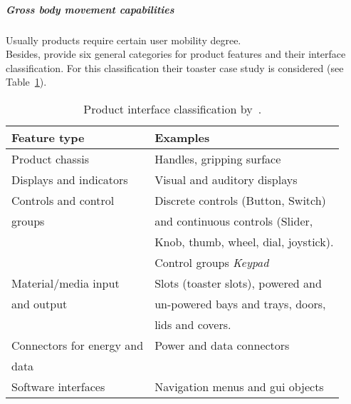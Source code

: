 \subparagraph*{Gross body movement capabilities}
Usually products require certain user mobility degree. 
\\
Besides, \citeauthor{persad_characterising_2007} provide six general categories 
for product features and their interface classification. For this classification 
their toaster case study is considered (see Table~\ref{tbl:persad_product_interface}).

\begin{table}
  \caption{Product interface classification by~\citet{persad_characterising_2007}.}
  \label{tbl:persad_product_interface}
\footnotesize
\centering
    \begin{tabular}{l l}
    \hline
    \textbf{Feature type} 	& \textbf{Examples} \\
    \hline
    Product chassis 		& Handles, gripping surface 		\\
    Displays and indicators 	& Visual and auditory displays 		\\
    Controls and control 	& Discrete controls (Button, Switch) 	\\
    groups			& and continuous controls (Slider,  	\\
				& Knob, thumb, wheel, dial, joystick).	\\
				& Control groups \textit{Keypad} 	\\
    Material/media input 	& Slots (toaster slots), powered and 	\\
    and output			& un-powered bays and trays, doors, 	\\
				& lids and covers.			\\
    Connectors for energy and  	& Power and data connectors 		\\
    data			& 					\\
    Software interfaces 	& Navigation menus and \ac{gui} objects \\
    \hline
  \end{tabular}
\end{table}

